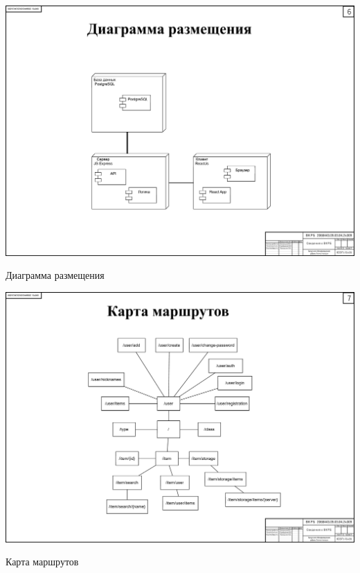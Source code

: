 \begin{landscape}
\begin{плакат}
	\centering
	\includegraphics[width=0.82\linewidth]{images/плакат6}
	\caption{Диаграмма размещения}
	\label{pl6:image}
\end{плакат}

\begin{плакат}
	\centering
	\includegraphics[width=0.82\linewidth]{images/плакат7}
	\caption{Карта маршрутов}
	\label{pl7:image}
\end{плакат}


\end{landscape}
